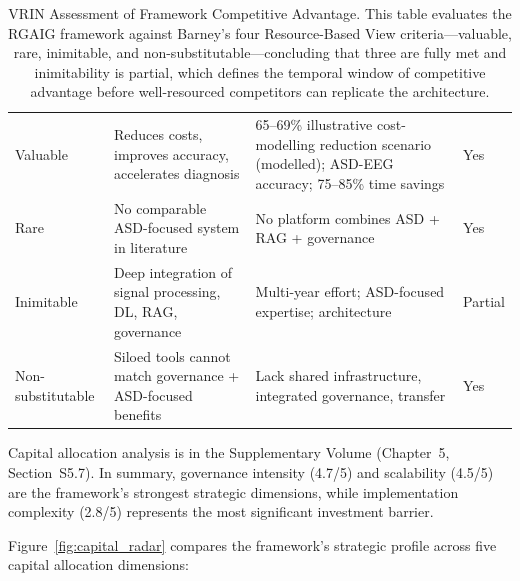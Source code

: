 \begin{table}[H]
\tablestripes\tablefontsize
\tablefontsize
\caption[VRIN Assessment of Framework Competitive Advantage]{VRIN Assessment of Framework Competitive Advantage. This table evaluates the RGAIG framework against Barney's four Resource-Based View criteria---valuable, rare, inimitable, and non-substitutable---concluding that three are fully met and inimitability is partial, which defines the temporal window of competitive advantage before well-resourced competitors can replicate the architecture.}
\begin{tabularx}{\textwidth}{@{} >{\raggedright\arraybackslash}p{2.4cm} L L >{\raggedright\arraybackslash}p{1.0cm} @{}}
\toprule
{} &  &  &  \\
\midrule
Valuable & Reduces costs, improves accuracy, accelerates diagnosis & 65--69\% illustrative cost-modelling reduction scenario (modelled); \asdacc{} ASD-EEG accuracy; 75--85\% time savings & Yes \\
\addlinespace
Rare & No comparable ASD-focused system in literature & No platform combines ASD + RAG + governance & Yes \\
\addlinespace
Inimitable & Deep integration of signal processing, DL, RAG, governance & Multi-year effort; ASD-focused expertise; architecture & Partial \\
\addlinespace
Non-substitutable & Siloed tools cannot match governance + ASD-focused benefits & Lack shared infrastructure, integrated governance, transfer & Yes \\
\bottomrule
\end{tabularx}
\end{table}

Capital allocation analysis is in the Supplementary Volume (Chapter~5, Section~S5.7). In summary, governance intensity (4.7/5) and scalability (4.5/5) are the framework's strongest strategic dimensions, while implementation complexity (2.8/5) represents the most significant investment barrier.

\iffalse
Figure~\ref{fig:capital_radar} compares the framework's strategic profile across five capital allocation dimensions:

